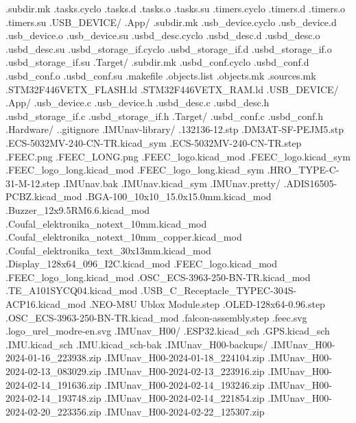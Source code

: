 \documentclass{article}
\begin{document}
{              .subdir.mk
              .tasks.cyclo
              .tasks.d
              .tasks.o
              .tasks.su
              .timers.cyclo
              .timers.d
              .timers.o
              .timers.su
      .USB_DEVICE/
        .App/
          .subdir.mk
          .usb_device.cyclo
          .usb_device.d
          .usb_device.o
          .usb_device.su
          .usbd_desc.cyclo
          .usbd_desc.d
          .usbd_desc.o
          .usbd_desc.su
          .usbd_storage_if.cyclo
          .usbd_storage_if.d
          .usbd_storage_if.o
          .usbd_storage_if.su
        .Target/
          .subdir.mk
          .usbd_conf.cyclo
          .usbd_conf.d
          .usbd_conf.o
          .usbd_conf.su
      .makefile
      .objects.list
      .objects.mk
      .sources.mk
    .STM32F446VETX_FLASH.ld
    .STM32F446VETX_RAM.ld
    .USB_DEVICE/
      .App/
        .usb_device.c
        .usb_device.h
        .usbd_desc.c
        .usbd_desc.h
        .usbd_storage_if.c
        .usbd_storage_if.h
      .Target/
        .usbd_conf.c
        .usbd_conf.h
.Hardware/
  ..gitignore
  .IMUnav-library/
    .132136-12.stp
    .DM3AT-SF-PEJM5.stp
    .ECS-5032MV-240-CN-TR.kicad_sym
    .ECS-5032MV-240-CN-TR.step
    .FEEC.png
    .FEEC_LONG.png
    .FEEC_logo.kicad_mod
    .FEEC_logo.kicad_sym
    .FEEC_logo_long.kicad_mod
    .FEEC_logo_long.kicad_sym
    .HRO_TYPE-C-31-M-12.step
    .IMUnav.bak
    .IMUnav.kicad_sym
    .IMUnav.pretty/
      .ADIS16505-PCBZ.kicad_mod
      .BGA-100_10x10_15.0x15.0mm.kicad_mod
      .Buzzer_12x9.5RM6.6.kicad_mod
      .Coufal_elektronika_notext_10mm.kicad_mod
      .Coufal_elektronika_notext_10mm_copper.kicad_mod
      .Coufal_elektronika_text_30x13mm.kicad_mod
      .Display_128x64_096_I2C.kicad_mod
      .FEEC_logo.kicad_mod
      .FEEC_logo_long.kicad_mod
      .OSC_ECS-3963-250-BN-TR.kicad_mod
      .TE_A101SYCQ04.kicad_mod
      .USB_C_Receptacle_TYPEC-304S-ACP16.kicad_mod
    .NEO-M8U Ublox Module.step
    .OLED-128x64-0.96.step
    .OSC_ECS-3963-250-BN-TR.kicad_mod
    .falcon-assembly.step
    .feec.svg
    .logo_urel_modre-en.svg
  .IMUnav_H00/
    .ESP32.kicad_sch
    .GPS.kicad_sch
    .IMU.kicad_sch
    .IMU.kicad_sch-bak
    .IMUnav_H00-backups/
      .IMUnav_H00-2024-01-16_223938.zip
      .IMUnav_H00-2024-01-18_224104.zip
      .IMUnav_H00-2024-02-13_083029.zip
      .IMUnav_H00-2024-02-13_223916.zip
      .IMUnav_H00-2024-02-14_191636.zip
      .IMUnav_H00-2024-02-14_193246.zip
      .IMUnav_H00-2024-02-14_193748.zip
      .IMUnav_H00-2024-02-14_221854.zip
      .IMUnav_H00-2024-02-20_223356.zip
      .IMUnav_H00-2024-02-22_125307.zip
}
\end{document}
